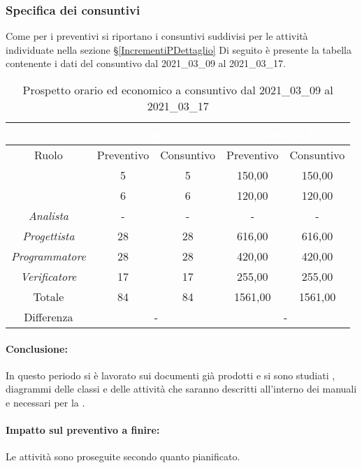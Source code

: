 \subsubsection{Specifica dei consuntivi}
Come per i preventivi si riportano i consuntivi suddivisi per le attività individuate nella sezione \S\ref{IncrementiPDettaglio}
Di seguito è presente la tabella contenente i dati del consuntivo dal 2021\_03\_09 al 2021\_03\_17.
\begin{table}[H]
	\centering
	\begin{tabular}{|c|c|c|c|c|}
		\rowcolor{darkblue} 
		&\multicolumn{2}{c|}{\textcolor{white}{Ore}}&\multicolumn{2}{c|}{\textcolor{white}{Costo in €}}\\ \hline
		Ruolo				&	Preventivo			&	Consuntivo		&	Preventivo	&	Consuntivo\\ \hline
		{\Responsabile}		&	5					&	5				&	150,00		&	150,00 \\ \hline
		{\Amministratore}	&	6					&	6				&	120,00		&	120,00 \\ \hline
		\textit{Analista}	&	-					&	-				&	-			&	- \\ \hline
		\textit{Progettista}& 	28					&   28 				& 	616,00		&  	616,00 \\ \hline
		\textit{Programmatore}& 28					& 	28				& 	420,00		&  	420,00 \\ \hline
		\textit{Verificatore}&	17					&	17				&	255,00		&	255,00\\ \hline
		Totale				&	84					&	84				&	1561,00		&	1561,00 \\ \hline
		Differenza			& 	\multicolumn{2}{c|}{-} 			    &\multicolumn{2}{c|}{-}\\ \hline
	\end{tabular}
	\caption{Prospetto orario ed economico a consuntivo dal 2021\_03\_09 al 2021\_03\_17}
\end{table}
\paragraph*{Conclusione:}
In questo periodo si è lavorato sui documenti già prodotti e si sono studiati , diagrammi delle classi e delle attività che saranno descritti all'interno dei manuali e necessari per la .
\paragraph*{Impatto sul preventivo a finire:}
Le attività sono proseguite secondo quanto pianificato.

